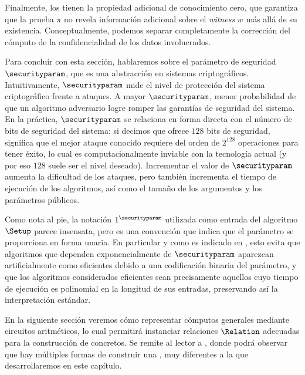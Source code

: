 Finalmente, los \zkSNARK tienen la propiedad adicional de conocimiento cero, que garantiza que la prueba $\pi$ no revela información adicional sobre el \textit{witness} $w$ más allá de su existencia. Conceptualmente, podemos separar completamente la corrección del cómputo de la confidencialidad de los datos involucrados.

Para concluir con esta sección, hablaremos sobre el parámetro de seguridad $\securityparam$, que es una abstracción en sistemas criptográficos. Intuitivamente, $\securityparam$ mide el nivel de protección del sistema criptográfico frente a ataques. A mayor $\securityparam$, menor probabilidad de que un algoritmo adversario logre romper las garantías de seguridad del sistema. En la práctica, $\securityparam$ se relaciona en forma directa con el número de bits de seguridad del sistema: si decimos que ofrece $128$ bits de seguridad, significa que el mejor ataque conocido requiere del orden de $2^{128}$ operaciones para tener éxito, lo cual es computacionalmente inviable con la tecnología actual (y por eso $128$ suele ser el nivel deseado). Incrementar el valor de $\securityparam$ aumenta la dificultad de los ataques, pero también incrementa el tiempo de ejecución de los algoritmos, así como el tamaño de los argumentos y los parámetros públicos.

Como nota al pie, la notación $1^\securityparam$ utilizada como entrada del algoritmo $\Setup$ parece insensata, pero es una convención que indica que el parámetro se proporciona en forma unaria. En particular y como es indicado en \cite{Goldreich2001}, esto evita que algoritmos que dependen exponencialmente de $\securityparam$ aparezcan artificialmente como eficientes debido a una codificación binaria del parámetro, y que los algoritmos considerados eficientes sean precisamente aquellos cuyo tiempo de ejecución es polinomial en la longitud de sus entradas, preservando así la interpretación estándar.

En la siguiente sección veremos cómo representar cómputos generales mediante circuitos aritméticos, lo cual permitirá instanciar relaciones $\Relation$ adecuadas para la construcción de \SNARK concretos. Se remite al lector a \cite{DBLP:journals/ftsec/Thaler22}, donde podrá observar que hay múltiples formas de construir una \SNARK, muy diferentes a la que desarrollaremos en este capítulo.
